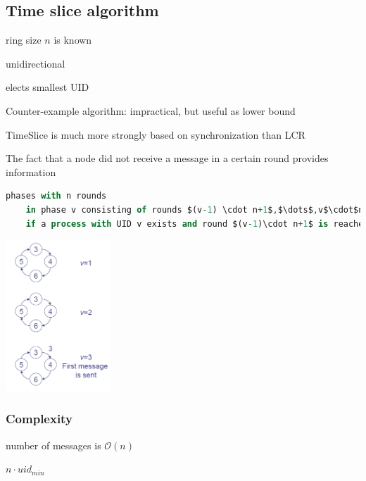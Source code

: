 \subsection{Time slice algorithm}
\begin{compactitem}
	\item ring size $n$ is known
	\item unidirectional
	\item elects smallest UID
	\item Counter-example algorithm: impractical, but useful as lower bound
	\item TimeSlice is much more strongly based on synchronization than LCR
	\begin{compactitem}
		\item The fact that a node did not receive a message in a certain round provides information
	\end{compactitem}
\end{compactitem}


\begin{lstlisting}[mathescape, language=VHDL]
	phases with n rounds
	in phase v consisting of rounds $(v-1) \cdot n+1$,$\dots$,v$\cdot$n only a token carrying UID v is permitted
	if a process with UID v exists and round $(v-1)\cdot n+1$ is reached without having received any messages, then it elects itself the leader and sends a token with it's UID
\end{lstlisting}

\begin{minipage}{\linewidth}
	\centering\includegraphics[width=150px]{gfx/timeslice.png}
	\label{img:timeslice}
\end{minipage}


\subsubsection{Complexity}
\begin{compactdesc}
	\item[Communication complexity] number of messages is $\mathcal{O}(n)$
	\item[Time complexity] $n\cdot uid_{min}$
\end{compactdesc}

